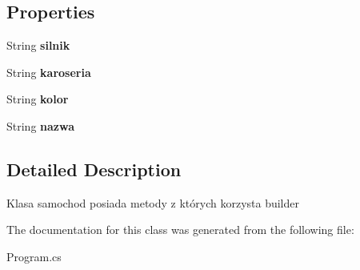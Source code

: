 \subsection*{Properties}
\begin{DoxyCompactItemize}
\item 
\mbox{\label{class_builder_1_1_program_1_1_samochod_ac36ea3564bfbea3fad2ed821b62bd757}} 
String {\bfseries silnik}
\item 
\mbox{\label{class_builder_1_1_program_1_1_samochod_ae11c5804edf3abb6b78ad4b62ca0d4ac}} 
String {\bfseries karoseria}
\item 
\mbox{\label{class_builder_1_1_program_1_1_samochod_a1c9be9a1d5768a8fea406444d64163e2}} 
String {\bfseries kolor}
\item 
\mbox{\label{class_builder_1_1_program_1_1_samochod_aab4d403164b723dbd367a08dfa689fde}} 
String {\bfseries nazwa}
\end{DoxyCompactItemize}


\subsection{Detailed Description}
Klasa samochod posiada metody z których korzysta builder 



The documentation for this class was generated from the following file\+:\begin{DoxyCompactItemize}
\item 
Program.\+cs\end{DoxyCompactItemize}
